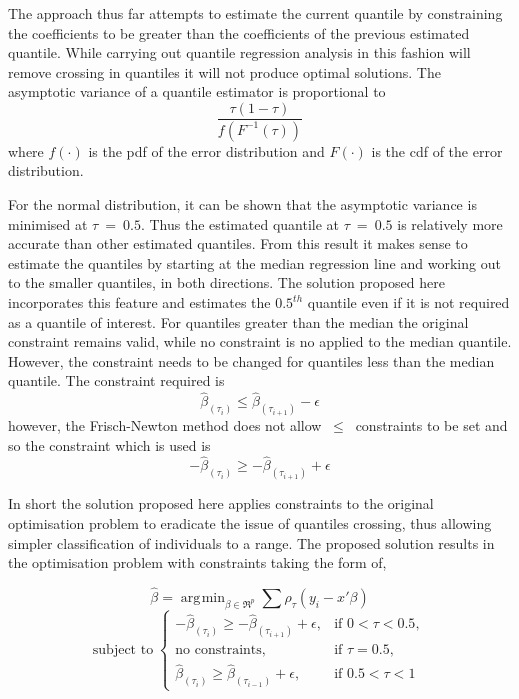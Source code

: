 \documentclass[12pt,a4paper]{report}
\DeclareMathOperator*{\argmin}{\arg\!\min}
\begin{document}
The approach thus far attempts to estimate the current quantile by constraining the coefficients to be greater than the coefficients of the previous estimated quantile. While carrying out quantile regression analysis in this fashion will remove crossing in quantiles it will not produce optimal solutions. The asymptotic variance of a quantile estimator is proportional to
$$\frac{\tau(1-\tau)}{f(F^{-1}(\tau))}$$
where $f(\cdot)$ is the pdf of the error distribution and $F(\cdot)$ is the cdf of the error distribution.
\vspace{2mm}

For the normal distribution, it can be shown that the asymptotic variance is minimised at $\tau\:=\:0.5$. Thus the estimated quantile at $\tau\:=\:0.5$ is relatively more accurate than other estimated quantiles. From this result it makes sense to estimate the quantiles by starting at the median regression line and working out to the smaller quantiles, in both directions. The solution proposed here incorporates this feature and estimates the $0.5^{th}$ quantile even if it is not required as a quantile of interest. For quantiles greater than the median the original constraint remains valid, while no constraint is no applied to the median quantile. However, the constraint needs to be changed for quantiles less than the median quantile. The constraint required is
$$\hat{\beta}_{(\tau_{i})}\leq\hat{\beta}_{(\tau_{i+1})}-\epsilon$$
however, the Frisch-Newton method does not allow $\:\leq\:$ constraints to be set and so the constraint which is used is
$$-\hat{\beta}_{(\tau_{i})}\geq-\hat{\beta}_{(\tau_{i+1})}+\epsilon$$
\vspace{1mm}

In short the solution proposed here applies constraints to the original optimisation problem to eradicate the issue of quantiles crossing, thus allowing simpler classification of individuals to a range. The proposed solution results in the optimisation problem with constraints taking the form of,


$$\hat{\beta}=\argmin_{\beta\in\Re^{p}}\sum\rho_{\tau}(y_{i}-x'\beta)$$
\[\text{subject to} \;
    \begin{cases}
        -\hat{\beta}_{(\tau_{i})}\geq-\hat{\beta}_{(\tau_{i+1})}+\epsilon,& \text{if } 0<\tau<0.5, \\
        \text{no constraints},& \text{if } \tau=0.5,\\
        \hat{\beta}_{(\tau_{i})}\geq\hat{\beta}_{(\tau_{i-1})}+\epsilon,& \text{if } 0.5<\tau<1
    \end{cases}
\]
\vspace{2mm}
\end{document}
